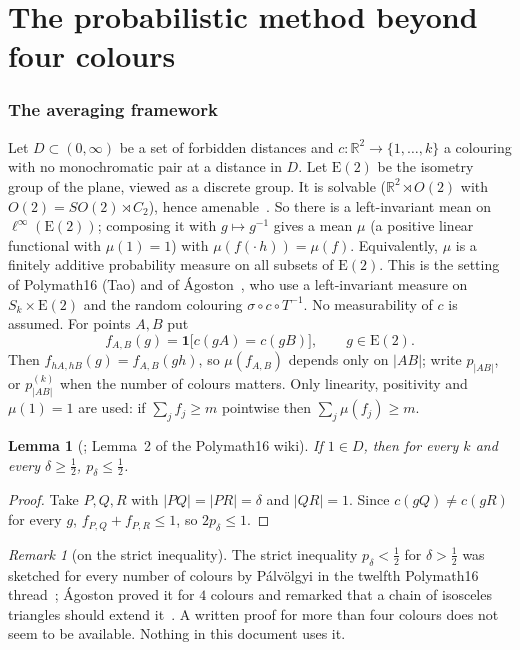 \documentclass[11pt,a4paper]{amsart}
\newtheorem{lemma}[theorem]{Lemma}
\theoremstyle{remark}
\newtheorem{remark}[theorem]{Remark}
\newcommand{\R}{\mathbb{R}}
\newcommand{\Euc}{\mathrm{E}(2)}
\begin{document}
\part{The probabilistic method beyond four colours}

\section{The averaging framework}\label{sec:avg}

Let $D\subset(0,\infty)$ be a set of forbidden distances and $c\colon\R^2\to\{1,\dots,k\}$ a colouring with no monochromatic pair at a distance in $D$. Let $\Euc$ be the isometry group of the plane, viewed as a discrete group. It is solvable ($\R^2\rtimes O(2)$ with $O(2)=SO(2)\rtimes C_2$), hence amenable~\cite{Ru02}. So there is a left-invariant mean on $\ell^\infty(\Euc)$; composing it with $g\mapsto g^{-1}$ gives a mean $\mu$ (a positive linear functional with $\mu(1)=1$) with $\mu(f(\cdot\,h))=\mu(f)$. Equivalently, $\mu$ is a finitely additive probability measure on all subsets of $\Euc$. This is the setting of Polymath16 (Tao) and of \'Agoston~\cite[\S4.1]{Ag21}, who use a left-invariant measure on $S_k\times\Euc$ and the random colouring $\sigma\circ c\circ T^{-1}$. No measurability of $c$ is assumed. For points $A,B$ put
\[
f_{A,B}(g)=\mathbf 1\bigl[c(gA)=c(gB)\bigr],\qquad g\in\Euc .
\]
Then $f_{hA,hB}(g)=f_{A,B}(gh)$, so $\mu(f_{A,B})$ depends only on $|AB|$; write $p_{|AB|}$, or $p^{(k)}_{|AB|}$ when the number of colours matters. Only linearity, positivity and $\mu(1)=1$ are used: if $\sum_j f_j\ge m$ pointwise then $\sum_j\mu(f_j)\ge m$.

\begin{lemma}[{\cite[Prop.~4.2.1]{Ag21}; Lemma~2 of the Polymath16 wiki}]\label{lem:half}
If $1\in D$, then for every $k$ and every $\delta\ge\tfrac12$, $p_\delta\le\tfrac12$.
\end{lemma}

\begin{proof}
Take $P,Q,R$ with $|PQ|=|PR|=\delta$ and $|QR|=1$. Since $c(gQ)\ne c(gR)$ for every $g$, $f_{P,Q}+f_{P,R}\le1$, so $2p_\delta\le1$.
\end{proof}

\begin{remark}[on the strict inequality]\label{rem:strict}
The strict inequality $p_\delta<\tfrac12$ for $\delta>\tfrac12$ was sketched for every number of colours by P\'alv\"olgyi in the twelfth Polymath16 thread~\cite{PM12}; \'Agoston proved it for $4$ colours and remarked that a chain of isosceles triangles should extend it~\cite[Prop.~4.2.6, Rem.~4.2.7]{Ag21}. A written proof for more than four colours does not seem to be available. Nothing in this document uses it.
\end{remark}
\end{document}
